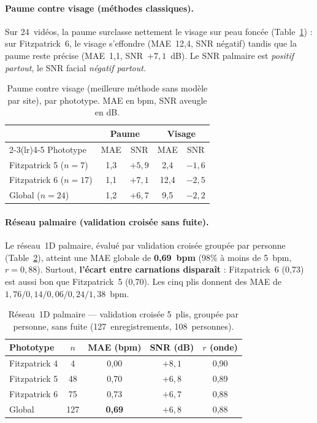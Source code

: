 \documentclass[11pt]{article}
\begin{document}
\paragraph{Paume contre visage (méthodes classiques).} Sur 24~vidéos, la paume
surclasse nettement le visage sur peau foncée (Table~\ref{tab:palmvsface}) : sur
Fitzpatrick~6, le visage s'effondre (MAE~12{,}4, SNR négatif) tandis que la paume
reste précise (MAE~1{,}1, SNR~$+7{,}1$~dB). Le SNR palmaire est \emph{positif partout},
le SNR facial \emph{négatif partout}.

\begin{table}[h]
\centering
\caption{Paume contre visage (meilleure méthode sans modèle par site), par phototype.
MAE en bpm, SNR aveugle en dB.}
\label{tab:palmvsface}
\begin{tabular}{lcccc}
\toprule
 & \multicolumn{2}{c}{\textbf{Paume}} & \multicolumn{2}{c}{\textbf{Visage}} \\
\cmidrule(lr){2-3}\cmidrule(lr){4-5}
Phototype & MAE & SNR & MAE & SNR \\
\midrule
Fitzpatrick 5 ($n=7$)  & 1{,}3 & $+5{,}9$ & 2{,}4  & $-1{,}6$ \\
Fitzpatrick 6 ($n=17$) & 1{,}1 & $+7{,}1$ & 12{,}4 & $-2{,}5$ \\
\midrule
Global ($n=24$)        & 1{,}2 & $+6{,}7$ & 9{,}5  & $-2{,}2$ \\
\bottomrule
\end{tabular}
\end{table}

\paragraph{Réseau palmaire (validation croisée sans fuite).} Le réseau~1D palmaire,
évalué par validation croisée groupée par personne (Table~\ref{tab:cv}), atteint une
MAE globale de \textbf{0{,}69~bpm} (98\% à moins de 5~bpm, $r=0{,}88$). Surtout,
\textbf{l'écart entre carnations disparaît} : Fitzpatrick~6 (0{,}73) est aussi bon que
Fitzpatrick~5 (0{,}70). Les cinq plis donnent des MAE de $1{,}76 / 0{,}14 / 0{,}06 /
0{,}24 / 1{,}38$~bpm.

\begin{table}[h]
\centering
\caption{Réseau~1D palmaire --- validation croisée 5~plis, groupée par personne, sans
fuite (127~enregistrements, 108~personnes).}
\label{tab:cv}
\begin{tabular}{lcccc}
\toprule
Phototype & $n$ & MAE (bpm) & SNR (dB) & $r$ (onde) \\
\midrule
Fitzpatrick 4 & 4  & 0{,}00 & $+8{,}1$ & 0{,}90 \\
Fitzpatrick 5 & 48 & 0{,}70 & $+6{,}8$ & 0{,}89 \\
Fitzpatrick 6 & 75 & 0{,}73 & $+6{,}7$ & 0{,}88 \\
\midrule
Global        & 127 & \textbf{0{,}69} & $+6{,}8$ & 0{,}88 \\
\bottomrule
\end{tabular}
\end{table}
\end{document}
